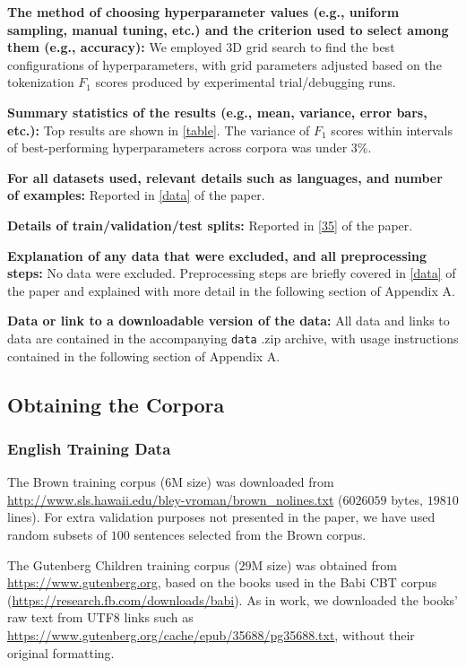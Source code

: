 \documentclass[11pt]{article}
\begin{document}
\textbf{The method of choosing hyperparameter values (e.g., uniform sampling, manual tuning, etc.) and the criterion used to select among them (e.g., accuracy):} We employed 3D grid search to find the best configurations of hyperparameters, with grid parameters adjusted based on the tokenization $F_1$ scores produced by experimental trial/debugging runs.  

\textbf{Summary statistics of the results (e.g., mean, variance, error bars, etc.):} Top results are shown in \autoref{table}. The variance of $F_1$ scores within intervals of best-performing hyperparameters across corpora was under $3$\%.  

\textbf{For all datasets used, relevant details such as languages, and number of examples:} Reported in \autoref{data} of the paper.

\textbf{Details of train/validation/test splits:} Reported in \autoref{35} of the paper.

\textbf{Explanation of any data that were excluded, and all preprocessing steps:} No data were excluded. Preprocessing steps are briefly covered in \autoref{data} of the paper and explained with more detail in the following section of Appendix A. 

\textbf{Data or link to a downloadable version of the data:} All data and links to data are contained in the accompanying \texttt{data} .zip archive, with usage instructions contained in the following section of Appendix A.

\subsection{Obtaining the Corpora}

\subsubsection{English Training Data}

The Brown training corpus ($6$M size) was downloaded from \url{http://www.sls.hawaii.edu/bley-vroman/brown_nolines.txt} ($6026059$ bytes,  $19810$ lines). For extra validation purposes not presented in the paper, we have used random subsets of $100$ sentences selected from the Brown corpus.

The Gutenberg Children training corpus ($29$M size) was obtained from \url{https://www.gutenberg.org}, based on the books used in the Babi CBT corpus (\url{https://research.fb.com/downloads/babi}). As in  work, we downloaded the books’ raw text from UTF8 links such as \url{https://www.gutenberg.org/cache/epub/35688/pg35688.txt}, without their original formatting.
\end{document}
